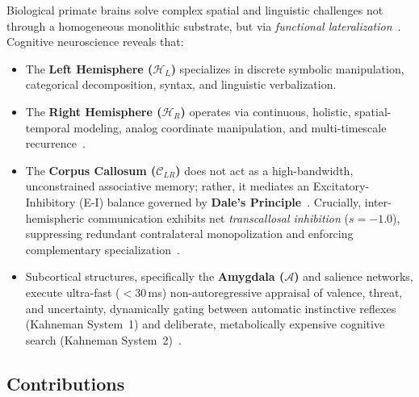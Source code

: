 \documentclass[11pt,a4paper]{article}
\theoremstyle{plain}
\theoremstyle{definition}
\theoremstyle{remark}
\newcommand{\HL}{\mathcal{H}_L}
\newcommand{\HR}{\mathcal{H}_R}
\newcommand{\CC}{\mathcal{C}_{LR}}
\newcommand{\AM}{\mathcal{A}}
\begin{document}
Biological primate brains solve complex spatial and linguistic challenges not through a homogeneous monolithic substrate, but via \emph{functional lateralization}~\cite{gazzaniga2000cerebral,sperry1968hemisphere,mcgilchrist2009master}. Cognitive neuroscience reveals that:
\begin{itemize}
    \item The \textbf{Left Hemisphere ($\HL$)} specializes in discrete symbolic manipulation, categorical decomposition, syntax, and linguistic verbalization.
    \item The \textbf{Right Hemisphere ($\HR$)} operates via continuous, holistic, spatial-temporal modeling, analog coordinate manipulation, and multi-timescale recurrence~\cite{wang2025hrm}.
    \item The \textbf{Corpus Callosum ($\CC$)} does not act as a high-bandwidth, unconstrained associative memory; rather, it mediates an Excitatory-Inhibitory (E-I) balance governed by \textbf{Dale's Principle}~\cite{eccles1954dale}. Crucially, inter-hemispheric communication exhibits net \emph{transcallosal inhibition} ($s = -1.0$), suppressing redundant contralateral monopolization and enforcing complementary specialization~\cite{jeong2026lateralization,murphy2009balanced}.
    \item Subcortical structures, specifically the \textbf{Amygdala ($\AM$)} and salience networks, execute ultra-fast ($<30$\,ms) non-autoregressive appraisal of valence, threat, and uncertainty, dynamically gating between automatic instinctive reflexes (Kahneman System~1) and deliberate, metabolically expensive cognitive search (Kahneman System~2)~\cite{kahneman2011thinking,cai2025openjev}.
\end{itemize}

\subsection{Contributions}
\end{document}
